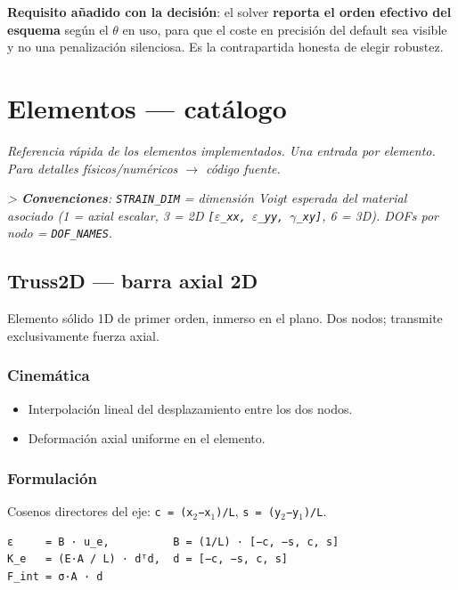 \documentclass[11pt,letterpaper,oneside]{report}
\begin{document}
   \textbf{Requisito añadido con la decisión}: el solver \textbf{reporta el orden efectivo del esquema} según el $\theta$ en uso, para que el coste en precisión del default sea visible y no una penalización silenciosa. Es la contrapartida honesta de elegir robustez.


\newpage

\chapter{Elementos — catálogo}



\textit{Referencia rápida de los elementos implementados. Una entrada por elemento. Para detalles físicos/numéricos \ensuremath{\to} código fuente.}

\textit{> \textbf{Convenciones}: \texttt{STRAIN\_DIM} = dimensión Voigt esperada del material asociado (1 = axial escalar, 3 = 2D \texttt{[\ensuremath{\varepsilon}\_xx, \ensuremath{\varepsilon}\_yy, \ensuremath{\gamma}\_xy]}, 6 = 3D). DOFs por nodo = \texttt{DOF\_NAMES}.}



\section{Truss2D --- barra axial 2D}

Elemento sólido 1D de primer orden, inmerso en el plano. Dos nodos; transmite exclusivamente fuerza axial.

\subsection{Cinemática}
\begin{itemize}
  \item Interpolación lineal del desplazamiento entre los dos nodos.
  \item Deformación axial uniforme en el elemento.
\end{itemize}

\subsection{Formulación}
Cosenos directores del eje: \texttt{c = (x\ensuremath{_{2}}−x\ensuremath{_{1}})/L}, \texttt{s = (y\ensuremath{_{2}}−y\ensuremath{_{1}})/L}.

\begin{lstlisting}
ε     = B · u_e,          B = (1/L) · [−c, −s, c, s]
K_e   = (E·A / L) · dᵀd,  d = [−c, −s, c, s]
F_int = σ·A · d

\end{lstlisting}
\end{document}
